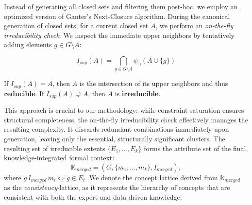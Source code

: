 Instead of generating all closed sets and filtering them post-hoc, we employ an optimized version of Ganter’s Next-Closure algorithm. During the canonical generation of closed sets, for a current closed set $A$, we perform an \emph{on-the-fly irreducibility check}. We inspect the immediate upper neighbors by tentatively adding elements $g \in G \setminus A$:

\begin{equation}
I_{sup}(A) = \bigcap_{g \in G \setminus A} \phi_\cap(A \cup \{g\})
\end{equation}

If $I_{sup}(A) = A$, then $A$ is the intersection of its upper neighbors and thus \textbf{reducible}. If $I_{sup}(A) \supsetneq A$, then $A$ is \textbf{irreducible}. 

This approach is crucial to our methodology: while constraint saturation ensures structural completeness, the on-the-fly irreducibility check effectively manages the resulting complexity. It discards redundant combinations immediately upon generation, leaving only the essential, structurally significant clusters. The resulting set of irreducible extents $\{E_1, \dots, E_k\}$ forms the attribute set of the final, knowledge-integrated formal context:
$$\mathbb{K}_{merged} = (G, \{m_1, \dots, m_k\}, I_{merged}),$$ where $g \, I_{merged} \, m_i \iff g \in E_i$.
We denote the concept lattice derived from $\mathbb{K}_{merged}$ as the \textit{consistency}-lattice, as it represents the hierarchy of concepts that are consistent with both the expert and data-driven knowledge.